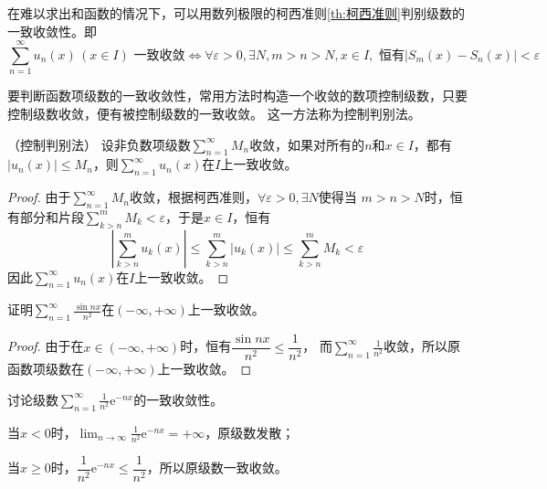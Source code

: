 在难以求出和函数的情况下，可以用数列极限的柯西准则\ref{th:柯西准则}判别级数的一致收敛性。即
\[
    \displaystyle\sum_{n=1}^\infty u_n(x)\,(x\in I)\text{ 一致收敛}
    \iff
    \forall \varepsilon >0,\exists N, m>n>N, x\in I, \text{ 恒有} |S_m(x)-S_n(x)|<\varepsilon
\]

要判断函数项级数的一致收敛性，常用方法时构造一个收敛的数项控制级数，只要控制级数收敛，便有被控制级数的一致收敛。
这一方法称为控制判别法。
\begin{theorem}
    （控制判别法）
    \label{th:控制判别法}
    设非负数项级数$\displaystyle\sum_{n=1}^\infty M_n$收敛，如果对所有的$n$和$x\in I$，都有
    $|u_n(x)|\leq M_n$，则$\displaystyle\sum_{n=1}^\infty u_n(x)$在$I$上一致收敛。
\end{theorem}
\begin{proof}
    由于$\displaystyle\sum_{n=1}^\infty M_n$收敛，根据柯西准则，$\forall \varepsilon>0,\exists N$使得当
    $m>n>N$时，恒有部分和片段$\displaystyle\sum_{k>n}^m M_k < \varepsilon$，于是$x\in I$，恒有
    \[ \left| \sum_{k>n}^m u_k(x) \right| \leq \sum_{k>n}^m |u_k(x)| \leq \sum_{k>n}^m M_k < \varepsilon \]
    因此$\displaystyle\sum_{n=1}^\infty u_n(x)$在$I$上一致收敛。
\end{proof}

\begin{example}
    证明$\displaystyle\sum_{n=1}^\infty \frac{\sin nx}{n^2}$在$(-\infty,+\infty)$上一致收敛。
\end{example}
\begin{proof}
    由于在$x\in(-\infty,+\infty)$时，恒有$\dfrac{\sin nx}{n^2} \leq \dfrac{1}{n^2}$，
    而$\displaystyle\sum_{n=1}^\infty \frac{1}{n^2}$收敛，所以原函数项级数在$(-\infty,+\infty)$上一致收敛。
\end{proof}

\begin{example}
    讨论级数$\displaystyle\sum_{n=1}^\infty \frac{1}{n^2}\mathrm{e}^{-nx}$的一致收敛性。
\end{example}
\begin{solution}
    当$x<0$时，$\displaystyle\lim_{n\to\infty} \frac{1}{n^2}\mathrm{e}^{-nx} = +\infty$，原级数发散；

    当$x\geq 0$时，$\dfrac{1}{n^2}\mathrm{e}^{-nx}\leq \dfrac{1}{n^2}$，所以原级数一致收敛。
\end{solution}


